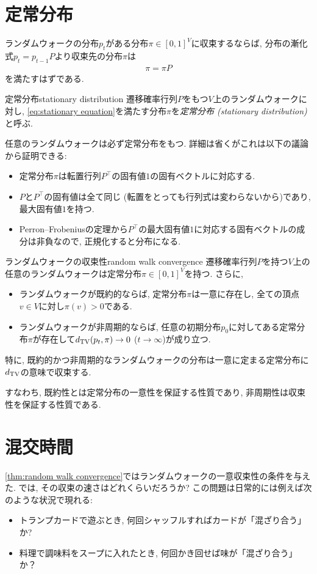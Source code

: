 \section{定常分布}
ランダムウォークの分布$p_t$がある分布$\pi\in[0,1]^V$に収束するならば, 分布の漸化式$p_t = p_{t-1}P$より収束先の分布$\pi$は
\begin{align}
  \pi = \pi P \label{eq:stationary equation}
\end{align}
を満たすはずである.
%
\begin{definition}{定常分布}{stationary distribution}
  遷移確率行列$P$をもつ$V$上のランダムウォークに対し, \cref{eq:stationary equation}を満たす分布$\pi$を\emph{定常分布 (stationary distribution)}と呼ぶ.
\end{definition}
%
任意のランダムウォークは必ず定常分布をもつ.
詳細は省くがこれは以下の議論から証明できる:
\begin{itemize}
  \item 定常分布$\pi$は転置行列$P^{\top}$の固有値$1$の固有ベクトルに対応する.
  \item $P$と$P^\top$の固有値は全て同じ (転置をとっても行列式は変わらないから)であり, 最大固有値$1$を持つ.
  \item Perron--Frobeniusの定理から$P^\top$の最大固有値$1$に対応する固有ベクトルの成分は非負なので, 正規化すると分布になる.
\end{itemize}
%
%
\begin{theorem}{ランダムウォークの収束性}{random walk convergence}
  遷移確率行列$P$を持つ$V$上の任意のランダムウォークは定常分布$\pi \in [0,1]^V$を持つ.
  さらに,
  \begin{itemize}
    \item ランダムウォークが既約的ならば, 定常分布$\pi$は一意に存在し, 全ての頂点$v\in V$に対し$\pi(v)>0$である.
    \item ランダムウォークが非周期的ならば, 任意の初期分布$p_0$に対してある定常分布$\pi$が存在して$d_{\mathrm{TV}}(p_t,\pi)\to 0$ ($t\to\infty$)が成り立つ.
  \end{itemize}

  特に, 既約的かつ非周期的なランダムウォークの分布は一意に定まる定常分布に$d_{\mathrm{TV}}$の意味で収束する.
\end{theorem}
すなわち, 既約性とは定常分布の一意性を保証する性質であり,
非周期性は収束性を保証する性質である.

\section{混交時間}
\cref{thm:random walk convergence}ではランダムウォークの一意収束性の条件を与えた.
では, その収束の速さはどれくらいだろうか?
この問題は日常的には例えば次のような状況で現れる:
\begin{itemize}
  \item トランプカードで遊ぶとき, 何回シャッフルすればカードが「混ざり合う」か?
  \item 料理で調味料をスープに入れたとき, 何回かき回せば味が「混ざり合う」か？
\end{itemize}

